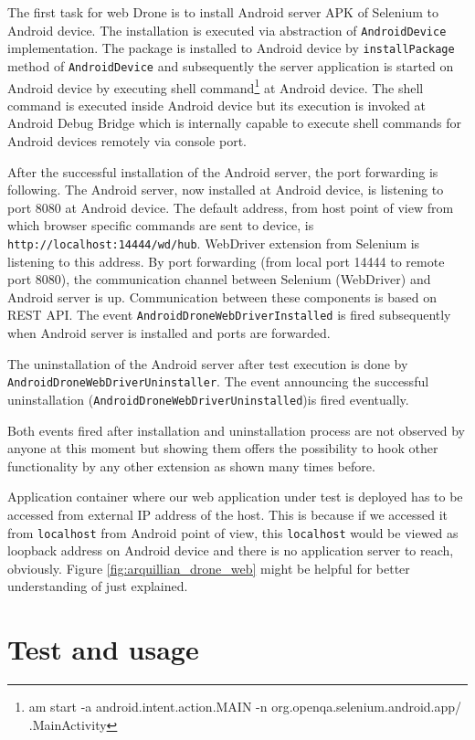 \documentclass[12pt,final,oneside]{fithesis}
\begin{document}
The first task for web Drone is to install Android server APK of Selenium to Android device. The installation is executed via abstraction of \texttt{AndroidDevice} implementation. The package is installed to Android device by \texttt{installPackage} method of \texttt{AndroidDevice} and subsequently the server application is started on Android device by executing shell command\footnote{am start -a android.intent.action.MAIN -n org.openqa.selenium.android.app/ .MainActivity} at Android device. The shell command is executed inside Android device but its execution is invoked at Android Debug Bridge which is internally capable to execute shell commands for Android devices remotely via console port.

After the successful installation of the Android server, the port forwarding is following. The Android server, now installed at Android device, is listening to port 8080 at Android device. The default address, from host point of view from which browser specific commands are sent to device, is \texttt{http://localhost:14444/wd/hub}. WebDriver extension from Selenium is listening to this address. By port forwarding (from local port 14444 to remote port 8080), the communication channel between Selenium (WebDriver) and Android server is up. Communication between these components is based on REST\cite{bib132} API. The event \texttt{AndroidDroneWebDriverInstalled} is fired subsequently when Android server is installed and ports are forwarded.

The uninstallation of the Android server after test execution is done by \texttt{AndroidDroneWebDriverUninstaller}. The event announcing the successful uninstallation (\texttt{AndroidDroneWebDriverUninstalled})is fired eventually.

Both events fired after installation and uninstallation process are not observed by anyone at this moment but showing them offers the possibility to hook other functionality by any other extension as shown many times before.

Application container where our web application under test is deployed has to be accessed from external IP address of the host. This is because if we accessed it from \texttt{localhost} from Android point of view, this \texttt{localhost} would be viewed as loopback address on Android device and there is no application server to reach, obviously. Figure \ref{fig:arquillian_drone_web} might be helpful for better understanding of just explained.

\section{Test and usage}
\end{document}
